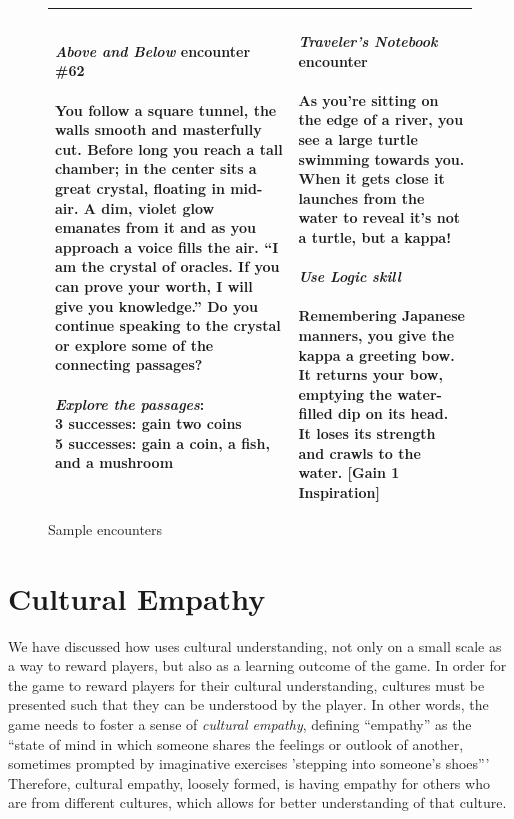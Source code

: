 \documentclass[a4paper]{article}
\begin{document}
\begin{figure}
\begin{tabular}{|p{\colwidth}|p{\colwidth}|}
{\textit{Above and Below} encounter \#62\\
\\
You follow a square tunnel, the walls smooth and masterfully cut.
Before long you reach a tall chamber; in the center sits a great crystal,
floating in mid-air. A dim, violet glow emanates from it and as you approach
a voice fills the air. ``I am the crystal of oracles. If you can prove
your worth, I will give you knowledge.'' Do you continue speaking to the
crystal or explore some of the connecting passages?\\
\\
\textit{Explore the passages}:\\
3 successes: gain two coins\\
5 successes: gain a coin, a fish, and a mushroom
}
& 
\specialcell{
\\
\textit{Traveler's Notebook} encounter\\
\\
As you're sitting on the edge of a river, you see a large turtle swimming towards you. When it gets close it launches from the water to reveal it's not a turtle, but a kappa!\\
\\
\textit{Use Logic skill}\\
\\
Remembering Japanese manners, you give the kappa a greeting bow. It returns your bow, emptying the water-filled dip on its head. It loses its strength and crawls to the water. [Gain 1 Inspiration]
}
\\\hline
\end{tabular}
\caption{Sample encounters}
\label{fig:encounters}
\end{figure}

\section{Cultural Empathy}

We have discussed how \totan{} uses cultural understanding, not only on a
small scale as a way to reward players, but also as a learning outcome of
the game. In order for the game to reward players for their cultural
understanding, cultures must be presented such that they can be understood
by the player. In other words, the game needs to foster a
sense of \textit{cultural empathy}, defining ``empathy'' as 
the ``state of mind in which someone shares the feelings or outlook of
another, sometimes prompted by imaginative exercises 'stepping into
someone's shoes'''~\citep[p.242]{Honderich2005}
Therefore, cultural
empathy, loosely formed, is having empathy for others who are from
different cultures, which allows for better understanding of that
culture.
\end{document}
